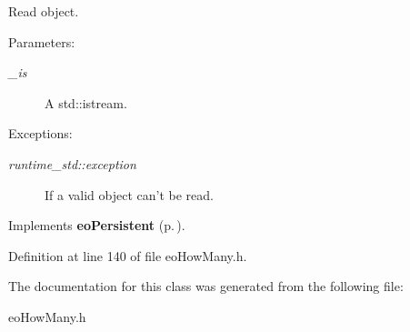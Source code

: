 Read object. 

\begin{Desc}
\item[Parameters:]
\begin{description}
\item[{\em \_\-is}]A std::istream. \end{description}
\end{Desc}
\begin{Desc}
\item[Exceptions:]
\begin{description}
\item[{\em runtime\_\-std::exception}]If a valid object can't be read. \end{description}
\end{Desc}


Implements {\bf eo\-Persistent} {\rm (p.\,\pageref{classeo_persistent_a1})}.

Definition at line 140 of file eo\-How\-Many.h.

The documentation for this class was generated from the following file:\begin{CompactItemize}
\item 
eo\-How\-Many.h\end{CompactItemize}
